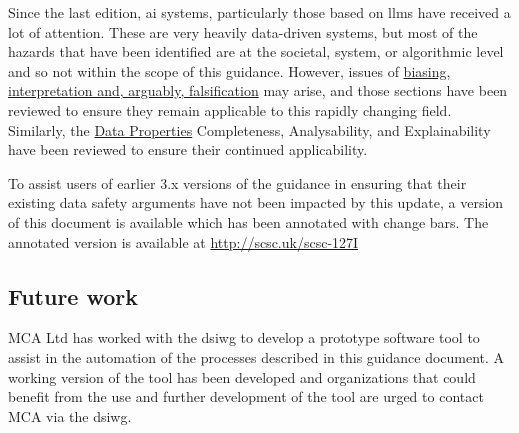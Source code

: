 Since the last edition, \gls{ai} systems, particularly those based on
\glspl{llm} have received a
lot of attention.
These are very heavily data-driven systems, but most of the hazards that have been identified are
at the societal, system, or algorithmic level and so not within the scope of this guidance.
However, issues of  \hyperref[tab:issues]{biasing, interpretation and, arguably, falsification}
may arise, and those sections have been reviewed to ensure they remain applicable to this rapidly
changing field.
Similarly, the \hyperref[bkm:guidance:dataproperties]{Data Properties}
Completeness, Analysability,
and Explainability have been reviewed to ensure their continued
applicability.

To assist users of earlier 3.x versions of the guidance in ensuring that their existing data safety arguments have not been impacted by this update, a version of this document is available which has been annotated with change bars. The annotated version is available at \href{http://scsc.uk/scsc-127I}{http://scsc.uk/scsc-127I}


\subsection*{Future work}

MCA Ltd has worked with the \gls{dsiwg} to develop a prototype software tool to assist in the automation of the processes described in this guidance document.
A working version of the tool has been developed and organizations that could benefit from the use and further development of the tool are urged to contact MCA via the \gls{dsiwg}.

